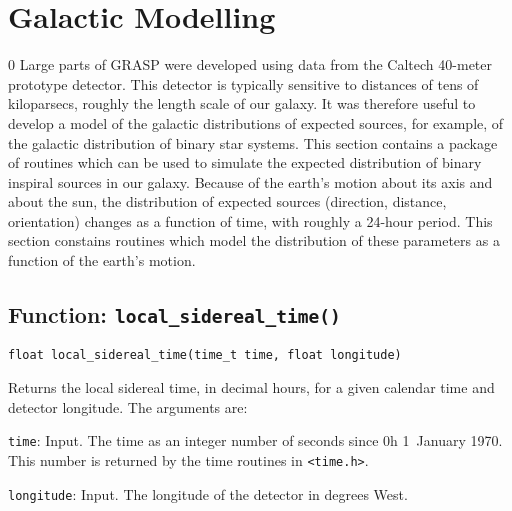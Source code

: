 \section{Galactic Modelling}
\label{s:galaxy}
\setcounter{equation}0
Large parts of GRASP were developed using data from the Caltech
40-meter prototype detector.  This detector is typically sensitive
to distances of tens of kiloparsecs, roughly the length scale of our
galaxy.  It was therefore useful to develop a model of the galactic
distributions of expected sources, for example, of the galactic
distribution
of binary star systems.  This section contains a package of routines
which can be used to simulate the expected distribution of binary
inspiral
sources in our galaxy.  Because of the earth's motion about its axis
and about the sun, the distribution of expected sources (direction,
distance, orientation) changes as a function of time, with roughly a
24-hour period.  This section constains routines which model the
distribution of these parameters as a function of the earth's motion.
\clearpage

\subsection{Function: \texttt{local\_sidereal\_time()}}
\label{ss:lst}

\begin{verbatim}
float local_sidereal_time(time_t time, float longitude)
\end{verbatim}

Returns the local sidereal time, in decimal hours, for a given calendar time
and detector longitude.  The arguments are:
\begin{description}
\item{\texttt{time}}: Input.  The time as an integer number of seconds since
  0h 1~January 1970.  This number is returned by the time routines in
  \texttt{<time.h>}.
\item{\texttt{longitude}}: Input.  The longitude of the detector in degrees
  West.
\end{description}

